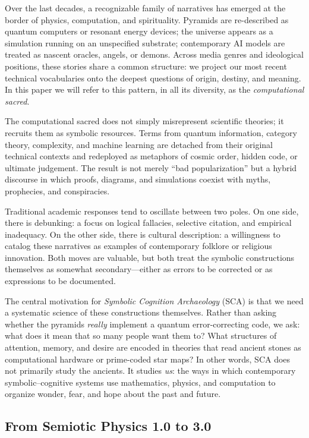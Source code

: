 \documentclass[12]{amsart}
\theoremstyle{plain}
\begin{document}
Over the last decades, a recognizable family of narratives has emerged at the border of physics, computation, and spirituality. Pyramids are re-described as quantum computers or resonant energy devices; the universe appears as a simulation running on an unspecified substrate; contemporary AI models are treated as nascent oracles, angels, or demons. Across media genres and ideological positions, these stories share a common structure: we project our most recent technical vocabularies onto the deepest questions of origin, destiny, and meaning. In this paper we will refer to this pattern, in all its diversity, as the \emph{computational sacred}.

The computational sacred does not simply misrepresent scientific theories; it recruits them as symbolic resources. Terms from quantum information, category theory, complexity, and machine learning are detached from their original technical contexts and redeployed as metaphors of cosmic order, hidden code, or ultimate judgement. The result is not merely ``bad popularization'' but a hybrid discourse in which proofs, diagrams, and simulations coexist with myths, prophecies, and conspiracies.

Traditional academic responses tend to oscillate between two poles. On one side, there is debunking: a focus on logical fallacies, selective citation, and empirical inadequacy. On the other side, there is cultural description: a willingness to catalog these narratives as examples of contemporary folklore or religious innovation. Both moves are valuable, but both treat the symbolic constructions themselves as somewhat secondary---either as errors to be corrected or as expressions to be documented.

The central motivation for \emph{Symbolic Cognition Archaeology} (SCA) is that we need a systematic science of these constructions themselves. Rather than asking whether the pyramids \emph{really} implement a quantum error-correcting code, we ask: what does it mean that so many people want them to? What structures of attention, memory, and desire are encoded in theories that read ancient stones as computational hardware or prime-coded star maps? In other words, SCA does not primarily study the ancients. It studies \emph{us}: the ways in which contemporary symbolic–cognitive systems use mathematics, physics, and computation to organize wonder, fear, and hope about the past and future.

\subsection{From Semiotic Physics 1.0 to 3.0}
\end{document}
